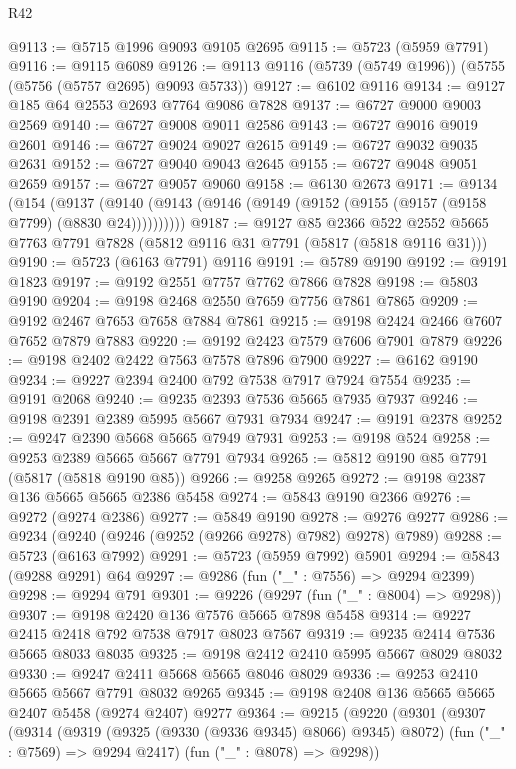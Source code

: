 \begin{lexlean}{R42}
\begin{coremodule}
@9113 := @5715 @1996 @9093 @9105 @2695
@9115 := @5723 (@5959 @7791)
@9116 := @9115 @6089
@9126 := @9113 @9116 (@5739 (@5749 @1996)) (@5755 (@5756 (@5757 @2695) @9093 @5733))
@9127 := @6102 @9116
@9134 := @9127 @185 @64 @2553 @2693 @7764 @9086 @7828
@9137 := @6727 @9000 @9003 @2569
@9140 := @6727 @9008 @9011 @2586
@9143 := @6727 @9016 @9019 @2601
@9146 := @6727 @9024 @9027 @2615
@9149 := @6727 @9032 @9035 @2631
@9152 := @6727 @9040 @9043 @2645
@9155 := @6727 @9048 @9051 @2659
@9157 := @6727 @9057 @9060
@9158 := @6130 @2673
@9171 := @9134
    (@154 (@9137 (@9140 (@9143 (@9146 (@9149 (@9152 (@9155 (@9157 (@9158 @7799) (@8830 @24))))))))))
@9187 := @9127
    @85
    @2366
    @522
    @2552
    @5665
    @7763
    @7791
    @7828
    (@5812 @9116 @31 @7791 (@5817 (@5818 @9116 @31)))
@9190 := @5723 (@6163 @7791) @9116
@9191 := @5789 @9190
@9192 := @9191 @1823
@9197 := @9192 @2551 @7757 @7762 @7866 @7828
@9198 := @5803 @9190
@9204 := @9198 @2468 @2550 @7659 @7756 @7861 @7865
@9209 := @9192 @2467 @7653 @7658 @7884 @7861
@9215 := @9198 @2424 @2466 @7607 @7652 @7879 @7883
@9220 := @9192 @2423 @7579 @7606 @7901 @7879
@9226 := @9198 @2402 @2422 @7563 @7578 @7896 @7900
@9227 := @6162 @9190
@9234 := @9227 @2394 @2400 @792 @7538 @7917 @7924 @7554
@9235 := @9191 @2068
@9240 := @9235 @2393 @7536 @5665 @7935 @7937
@9246 := @9198 @2391 @2389 @5995 @5667 @7931 @7934
@9247 := @9191 @2378
@9252 := @9247 @2390 @5668 @5665 @7949 @7931
@9253 := @9198 @524
@9258 := @9253 @2389 @5665 @5667 @7791 @7934
@9265 := @5812 @9190 @85 @7791 (@5817 (@5818 @9190 @85))
@9266 := @9258 @9265
@9272 := @9198 @2387 @136 @5665 @5665 @2386 @5458
@9274 := @5843 @9190 @2366
@9276 := @9272 (@9274 @2386)
@9277 := @5849 @9190
@9278 := @9276 @9277
@9286 := @9234 (@9240 (@9246 (@9252 (@9266 @9278) @7982) @9278) @7989)
@9288 := @5723 (@6163 @7992)
@9291 := @5723 (@5959 @7992) @5901
@9294 := @5843 (@9288 @9291) @64
@9297 := @9286 (fun ("_" : @7556) => @9294 @2399)
@9298 := @9294 @791
@9301 := @9226 (@9297 (fun ("_" : @8004) => @9298))
@9307 := @9198 @2420 @136 @7576 @5665 @7898 @5458
@9314 := @9227 @2415 @2418 @792 @7538 @7917 @8023 @7567
@9319 := @9235 @2414 @7536 @5665 @8033 @8035
@9325 := @9198 @2412 @2410 @5995 @5667 @8029 @8032
@9330 := @9247 @2411 @5668 @5665 @8046 @8029
@9336 := @9253 @2410 @5665 @5667 @7791 @8032 @9265
@9345 := @9198 @2408 @136 @5665 @5665 @2407 @5458 (@9274 @2407) @9277
@9364 := @9215
    (@9220
      (@9301
        (@9307
          (@9314
            (@9319 (@9325 (@9330 (@9336 @9345) @8066) @9345) @8072)
            (fun ("_" : @7569) => @9294 @2417)
            (fun ("_" : @8078) => @9298))

\end{coremodule}
\end{lexlean}
